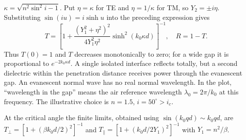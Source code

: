 $\kappa=\sqrt{n^2\sin^2i-1}$. Put $\eta=\kappa$ for TE and
$\eta=1/\kappa$ for TM, so $Y_2=\pm i\eta$. Substituting
$\sin(iu)=i\sinh u$ into the preceding expression gives
\[
\boxed{T=\left[1+\frac{(Y_1^2+\eta^2)^2}{4Y_1^2\eta^2}
                         \sinh^2(k_0\kappa d)\right]^{-1},\quad R=1-T.}
\]
Thus $T(0)=1$ and $T$ decreases monotonically to zero; for a wide
gap it is proportional to $e^{-2k_0\kappa d}$. A single isolated
interface reflects totally, but a second dielectric within the
penetration distance receives power through the evanescent gap.
An evanescent normal wave has no real normal wavelength. In the
plot, ``wavelength in the gap'' means the air reference wavelength
$\lambda_0=2\pi/k_0$ at this frequency. The illustrative choice is
$n=1.5$, $i=50^\circ>i_c$.
\begin{center}

\end{center}
At the critical angle the finite limits, obtained using
$\sin(k_0qd)\sim k_0qd$, are
$T_\perp=[1+(\beta k_0d/2)^2]^{-1}$ and
$T_\parallel=[1+(k_0d/2Y_1)^2]^{-1}$ with $Y_1=n^2/\beta$.

